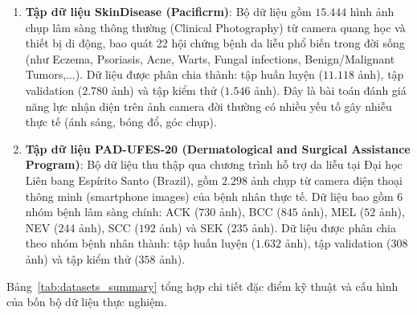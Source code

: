 \begin{enumerate}[label=\textbf{\arabic*.}]
  \item \textbf{Tập dữ liệu SkinDisease (Pacificrm)}:
  Bộ dữ liệu gồm $15.444$ hình ảnh chụp lâm sàng thông thường (Clinical Photography) từ camera quang học và thiết bị di động, bao quát 22 hội chứng bệnh da liễu phổ biến trong đời sống (như Eczema, Psoriasis, Acne, Warts, Fungal infections, Benign/Malignant Tumors,...). Dữ liệu được phân chia thành: tập huấn luyện ($11.118$ ảnh), tập validation ($2.780$ ảnh) và tập kiểm thử ($1.546$ ảnh). Đây là bài toán đánh giá năng lực nhận diện trên ảnh camera đời thường có nhiều yếu tố gây nhiễu thực tế (ánh sáng, bóng đổ, góc chụp).

  \item \textbf{Tập dữ liệu PAD-UFES-20 (Dermatological and Surgical Assistance Program)}:
  Bộ dữ liệu thu thập qua chương trình hỗ trợ da liễu tại Đại học Liên bang Espírito Santo (Brazil), gồm $2.298$ ảnh chụp từ camera điện thoại thông minh (smartphone images) của bệnh nhân thực tế. Dữ liệu bao gồm 6 nhóm bệnh lâm sàng chính: ACK ($730$ ảnh), BCC ($845$ ảnh), MEL ($52$ ảnh), NEV ($244$ ảnh), SCC ($192$ ảnh) và SEK ($235$ ảnh). Dữ liệu được phân chia theo nhóm bệnh nhân thành: tập huấn luyện ($1.632$ ảnh), tập validation ($308$ ảnh) và tập kiểm thử ($358$ ảnh).
\end{enumerate}

Bảng~\ref{tab:datasets_summary} tổng hợp chi tiết đặc điểm kỹ thuật và cấu hình của bốn bộ dữ liệu thực nghiệm.

\begin{table}[H]
\centering
\caption{Tổng hợp đặc tính các bộ dữ liệu hình ảnh da liễu thực nghiệm trong đề tài}
\label{tab:datasets_summary}
\small
{}
\end{table}


